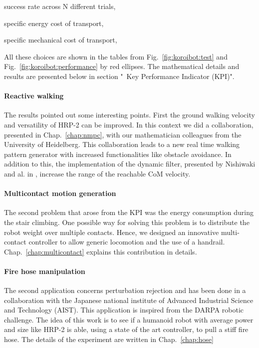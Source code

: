 \begin{list}{ .}{%
		\setlength{\topsep}{5pt}%
		\setlength{\itemsep}{0pt}%
		\setlength{\parsep}{0pt}%
		\setlength{\labelwidth}{3.em}%
		\setlength{\leftmargin}{2em}%
		\setlength{\labelsep}{0.5em}%
	}
\item[\bluesquare] success rate across N different trials,
\item[\bluesquare] specific energy cost of transport,
\item[\bluesquare] specific mechanical cost of transport,
\end{list}
All these choices are shown in the tables from Fig.~\ref{fig:koroibot:test} and Fig.~\ref{fig:koroibot:performance} by red ellipses.
The mathematical details and results are presented below in section {"\koroibot\ Key Performance Indicator (KPI)"}.

\paragraph*{Reactive walking}
The results pointed out some interesting points.
First the ground walking velocity and versatility of HRP-2 can be improved.
In this context we did a collaboration, presented in Chap.~\ref{chap:nmpc}, with our mathematician colleagues from the University of Heidelberg.
This collaboration leads to a new real time walking pattern generator with increased functionalities like obstacle avoidance.
In addition to this, the implementation of the dynamic filter, presented by Nishiwaki and al. in \cite{Nishiwaki:IJRR:09}, increase the range of the reachable CoM velocity.
\paragraph*{Multicontact motion generation}
The second problem that arose from the KPI was the energy consumption during the stair climbing.
One possible way for solving this problem is to distribute the robot weight over multiple contacts.
Hence, we designed an innovative multi-contact controller to allow generic locomotion and the use of a handrail.
Chap.~\ref{chap:multicontact} explains this contribution in details.
\paragraph*{Fire hose manipulation}
The second application concerns perturbation rejection and has been done in a collaboration with the Japanese national institute of Advanced Industrial Science and Technology (AIST).
This application is inspired from the DARPA robotic challenge.
The idea of this work is to see if a humanoid robot with average power and size like HRP-2 is able, using a state of the art controller, to pull a stiff fire hose.
The details of the experiment are written in Chap.~\ref{chap:hose}
